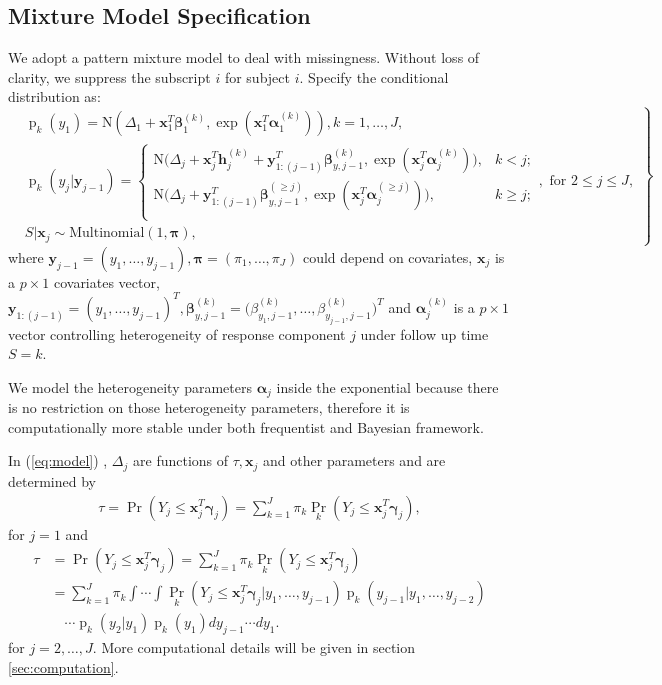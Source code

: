 \documentclass[12pt]{article}
\DeclareMathOperator{\pr}{p}
\DeclareMathOperator{\prob}{Pr}
\begin{document}
\subsection{Mixture Model Specification}
\label{sec:settings}
We adopt a pattern mixture model to deal with missingness.  Without
loss of clarity, we suppress the subscript $i$ for subject
$i$. Specify the conditional distribution as:
\begin{equation}
  \label{eq:model}
  \left.  \begin{aligned}
      & \pr_k(y_1) = \textrm{N} (\Delta_1 + \bm x_1^T \bm \beta_1^{(k)},
      \exp (\bm x_{1}^T \bm \alpha_1^{(k)} ) ), k = 1, \ldots, J,\\
      &\pr_k(y_j|\bm y_{j-1}) =
      \begin{cases}
        \textrm{N} \big (\Delta_j + \bm x_{j}^T \bm h_{j}^{(k)} + \bm
        y_{1:(j-1)}^T \bm \beta_{y,j-1}^{(k)},
        \exp (\bm x_{j}^T \bm \alpha_j^{(k)} ) \big), & k < j ;  \\
        \textrm{N} \big (\Delta_j + \bm y_{1:(j-1)}^T \bm
        \beta_{y,j-1}^{(\geq j)},
        \exp (\bm x_{j}^T \bm \alpha_j^{(\geq j)} ) \big), & k \geq j ;  \\
      \end{cases}, \text{ for } 2 \leq j \leq J,  \\
      &S| \bm x_j \sim \textrm{Multinomial}(1, \bm \pi),
    \end{aligned} \right\}
\end{equation}
where $\bm y_{j-1} = (y_1, \ldots, y_{j-1}), \bm \pi = (\pi_1, \ldots,
\pi_J)$ could depend on covariates, $\bm x_j$ is a $p \times 1$
covariates vector, $\bm y_{1:(j-1)} = (y_1, \ldots, y_{j-1})^T, \bm
\beta_{y, j-1}^{(k)} = \big(\beta_{y_1, j-1}^{(k)}, \ldots,
\beta_{y_{j-1}, j-1}^{(k)} \big)^T$ and $\bm \alpha_j^{(k)}$ is a $p
\times 1$ vector controlling heterogeneity of response component $j$
under follow up time $S = k$.

We model the heterogeneity parameters $\bm \alpha_j$ inside the
exponential because there is no restriction on those heterogeneity
parameters, therefore it is computationally more stable under both
frequentist and Bayesian framework.

In (\ref{eq:model}) , $\Delta_j$ are functions of $\tau, \bm x_j$ and
other parameters and are determined by
\begin{align}
  \label{eq:deltaeqn1}
  \tau = \prob (Y_j \leq \bm x_j^T \bm \gamma_j ) = \sum_{k=1}^J
  \pi_k\prob_k (Y_j \leq \bm x_j^T \bm \gamma_j ),
\end{align}
for $j = 1$ and
\begin{align}\label{eq:deltaeqn2}
  \tau &= \prob (Y_j \leq \bm x_j^{T} \bm \gamma_j ) = \sum_{k=1}^J
  \pi_k\prob_k (Y_j \leq \bm x_j^{T} \bm \gamma_j ) \\
  & = \sum_{k=1}^J \pi_k \int\cdots \int \prob_k (Y_j \leq \bm x_j^{T}
  \bm \gamma_j |y_1,\ldots,
  y_{j-1}) \pr_k (y_{j-1}| y_1, \ldots, y_{j-2})  \nonumber \\
  & \quad \cdots \pr_k (y_{2}| y_1) \pr_k(y_1) dy_{j-1}\cdots
  dy_1. \nonumber
\end{align}
for $j = 2, \ldots, J$. More computational details will be given in
section \ref{sec:computation}.
\end{document}
